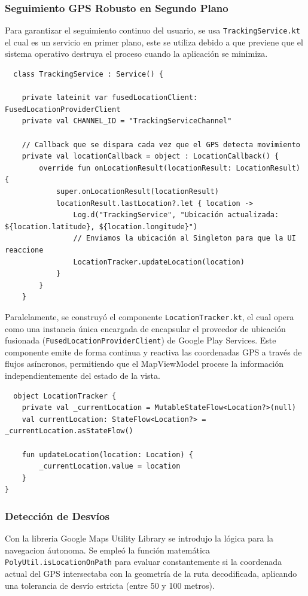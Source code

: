 \subsubsection{Seguimiento GPS Robusto en Segundo Plano}
Para garantizar el seguimiento continuo del usuario, se usa \texttt{TrackingService.kt} el cual es un servicio en primer plano, este se utiliza debido a que previene que el sistema operativo destruya el proceso cuando la aplicación se minimiza. 
\begin{lstlisting}
  class TrackingService : Service() {

    private lateinit var fusedLocationClient: FusedLocationProviderClient
    private val CHANNEL_ID = "TrackingServiceChannel"

    // Callback que se dispara cada vez que el GPS detecta movimiento
    private val locationCallback = object : LocationCallback() {
        override fun onLocationResult(locationResult: LocationResult) {
            super.onLocationResult(locationResult)
            locationResult.lastLocation?.let { location ->
                Log.d("TrackingService", "Ubicación actualizada: ${location.latitude}, ${location.longitude}")
                // Enviamos la ubicación al Singleton para que la UI reaccione
                LocationTracker.updateLocation(location)
            }
        }
    }
\end{lstlisting}

Paralelamente, se construyó el componente \texttt{LocationTracker.kt}, el cual opera como una instancia única encargada de encapsular el proveedor de ubicación fusionada (\texttt{FusedLocationProviderClient}) de Google Play Services. Este componente emite de forma continua y reactiva las coordenadas GPS a través de flujos asíncronos, permitiendo que el MapViewModel procese la información independientemente del estado de la vista.

\begin{lstlisting}
  object LocationTracker {
    private val _currentLocation = MutableStateFlow<Location?>(null)
    val currentLocation: StateFlow<Location?> = _currentLocation.asStateFlow()

    fun updateLocation(location: Location) {
        _currentLocation.value = location
    }
}
\end{lstlisting}


\subsubsection{Detección de Desvíos}
Con la libreria Google Maps Utility Library se introdujo la lógica para la navegacion áutonoma. Se empleó la función matemática \texttt{PolyUtil.isLocationOnPath} para evaluar constantemente si la coordenada actual del GPS intersectaba con la geometría de la ruta decodificada, aplicando una tolerancia de desvío estricta (entre 50 y 100 metros).

